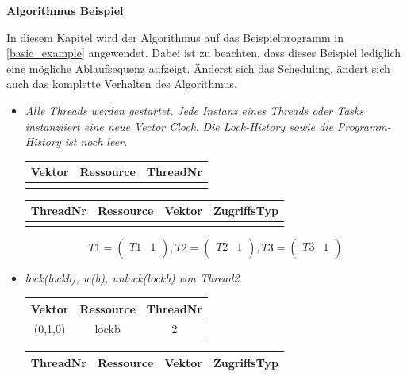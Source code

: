 \documentclass[10pt,a4paper]{article}
\begin{document}
\textbf{Algorithmus Beispiel}
\begin{flushleft}
In diesem Kapitel wird der Algorithmus auf das Beispielprogramm  in \autoref{basic_example} angewendet. Dabei ist zu beachten, dass dieses Beispiel lediglich eine mögliche Ablaufsequenz aufzeigt. Änderst sich das Scheduling, ändert sich auch das komplette Verhalten des Algorithmus.\\
\begin{itemize}
\item \textit{Alle Threads werden gestartet. Jede Instanz eines Threads oder Tasks instanziiert eine neue Vector Clock. Die Lock-History sowie die Programm-History ist noch leer.}\\[0.3cm]
\begin{tabular}{ >{\small}c >{\small}c >{\small}c }
  	Vektor & Ressource & ThreadNr \\\hline
  	  &   &   \\\hline
\end{tabular}\hspace*{0.5cm}
\begin{tabular}{ >{\small}c >{\small}c >{\small}c >{\small}c }
  	ThreadNr & Ressource & Vektor & ZugriffsTyp \\\hline
  	  &   &   &   \\\hline
\end{tabular}
\[
	T1 = \begin{pmatrix}
		T1 & 1\\
	\end{pmatrix}
	, T2 = \begin{pmatrix}
		T2 & 1\\
	\end{pmatrix}
	, T3 = \begin{pmatrix}
		T3 & 1\\
	\end{pmatrix}
\]
\item \textit{lock(lockb), w(b), unlock(lockb) von Thread2}\\[0.3cm]
\begin{tabular}{ >{\small}c >{\small}c >{\small}c }
  	Vektor & Ressource & ThreadNr \\\hline
  	(0,1,0) & lockb & 2 \\\hline
\end{tabular}\hspace*{0.5cm}
\begin{tabular}{ >{\small}c >{\small}c >{\small}c >{\small}c }
  	ThreadNr & Ressource & Vektor & ZugriffsTyp \\\hline

\end{tabular}
\end{itemize}
\end{flushleft}
\end{document}
